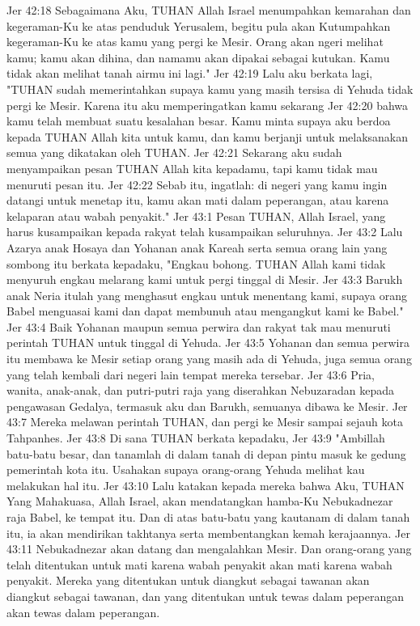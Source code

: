 Jer 42:18  Sebagaimana Aku, TUHAN Allah Israel menumpahkan kemarahan dan kegeraman-Ku ke atas penduduk Yerusalem, begitu pula akan Kutumpahkan kegeraman-Ku ke atas kamu yang pergi ke Mesir. Orang akan ngeri melihat kamu; kamu akan dihina, dan namamu akan dipakai sebagai kutukan. Kamu tidak akan melihat tanah airmu ini lagi."
Jer 42:19  Lalu aku berkata lagi, "TUHAN sudah memerintahkan supaya kamu yang masih tersisa di Yehuda tidak pergi ke Mesir. Karena itu aku memperingatkan kamu sekarang
Jer 42:20  bahwa kamu telah membuat suatu kesalahan besar. Kamu minta supaya aku berdoa kepada TUHAN Allah kita untuk kamu, dan kamu berjanji untuk melaksanakan semua yang dikatakan oleh TUHAN.
Jer 42:21  Sekarang aku sudah menyampaikan pesan TUHAN Allah kita kepadamu, tapi kamu tidak mau menuruti pesan itu.
Jer 42:22  Sebab itu, ingatlah: di negeri yang kamu ingin datangi untuk menetap itu, kamu akan mati dalam peperangan, atau karena kelaparan atau wabah penyakit."
Jer 43:1  Pesan TUHAN, Allah Israel, yang harus kusampaikan kepada rakyat telah kusampaikan seluruhnya.
Jer 43:2  Lalu Azarya anak Hosaya dan Yohanan anak Kareah serta semua orang lain yang sombong itu berkata kepadaku, "Engkau bohong. TUHAN Allah kami tidak menyuruh engkau melarang kami untuk pergi tinggal di Mesir.
Jer 43:3  Barukh anak Neria itulah yang menghasut engkau untuk menentang kami, supaya orang Babel menguasai kami dan dapat membunuh atau mengangkut kami ke Babel."
Jer 43:4  Baik Yohanan maupun semua perwira dan rakyat tak mau menuruti perintah TUHAN untuk tinggal di Yehuda.
Jer 43:5  Yohanan dan semua perwira itu membawa ke Mesir setiap orang yang masih ada di Yehuda, juga semua orang yang telah kembali dari negeri lain tempat mereka tersebar.
Jer 43:6  Pria, wanita, anak-anak, dan putri-putri raja yang diserahkan Nebuzaradan kepada pengawasan Gedalya, termasuk aku dan Barukh, semuanya dibawa ke Mesir.
Jer 43:7  Mereka melawan perintah TUHAN, dan pergi ke Mesir sampai sejauh kota Tahpanhes.
Jer 43:8  Di sana TUHAN berkata kepadaku,
Jer 43:9  "Ambillah batu-batu besar, dan tanamlah di dalam tanah di depan pintu masuk ke gedung pemerintah kota itu. Usahakan supaya orang-orang Yehuda melihat kau melakukan hal itu.
Jer 43:10  Lalu katakan kepada mereka bahwa Aku, TUHAN Yang Mahakuasa, Allah Israel, akan mendatangkan hamba-Ku Nebukadnezar raja Babel, ke tempat itu. Dan di atas batu-batu yang kautanam di dalam tanah itu, ia akan mendirikan takhtanya serta membentangkan kemah kerajaannya.
Jer 43:11  Nebukadnezar akan datang dan mengalahkan Mesir. Dan orang-orang yang telah ditentukan untuk mati karena wabah penyakit akan mati karena wabah penyakit. Mereka yang ditentukan untuk diangkut sebagai tawanan akan diangkut sebagai tawanan, dan yang ditentukan untuk tewas dalam peperangan akan tewas dalam peperangan.
